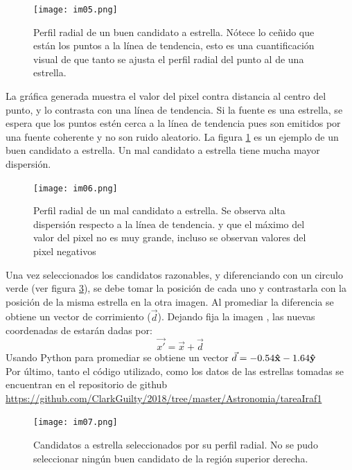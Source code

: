 \documentclass[12pt]{article}
\begin{document}
\begin{figure}[H]
  \centering
   \texttt{[image: im05.png]}
  \caption{Perfil radial de un buen candidato a estrella. Nótece lo ceñido que están los puntos a la línea de tendencia, esto es una cuantificación visual de que tanto se ajusta el perfil radial del punto al de una estrella.}
  \label{im05}
\end{figure}

La gráfica generada muestra el valor del pixel contra distancia al centro del punto, y lo contrasta con una línea de tendencia. Si la fuente es una estrella, se espera que los puntos estén cerca a la línea de tendencia pues son emitidos por una fuente coherente y no son ruido aleatorio. La figura \ref{im05} es un ejemplo de un buen candidato a estrella. Un mal candidato a estrella tiene mucha mayor dispersión. 



\begin{figure}[H]
  \centering
   \texttt{[image: im06.png]}
  \caption{Perfil radial de un mal candidato a estrella. Se observa alta dispersión respecto a la línea de tendencia. y que el máximo del valor del pixel no es muy grande, incluso se observan valores del pixel negativos}
  \label{im06}
\end{figure}

Una vez seleccionados los candidatos razonables, y diferenciando con un circulo verde (ver figura \ref{im07}), se debe tomar la posición de cada uno y contrastarla con la posición de la misma estrella en la otra imagen. Al promediar la diferencia se obtiene un vector de corrimiento ($\vec{d}$). Dejando fija la imagen , las nuevas coordenadas de  estarán dadas por:
\begin{equation}
\vec{x'}= \vec{x} + \vec{d}
\end{equation}
Usando Python para promediar se obtiene un vector $\vec{d} = -0.54\vu{x} -1.64\vu{y}$\\
Por último, tanto el código utilizado, como los datos de las estrellas tomadas se  encuentran en el repositorio de github \url{https://github.com/ClarkGuilty/2018/tree/master/Astronomia/tareaIraf1}

\begin{figure}[H]
  \centering
   \texttt{[image: im07.png]}
  \caption{Candidatos a estrella seleccionados por su perfil radial. No se pudo seleccionar ningún buen candidato de la región superior derecha.}
  \label{im07}
\end{figure}



{}

\end{document}
